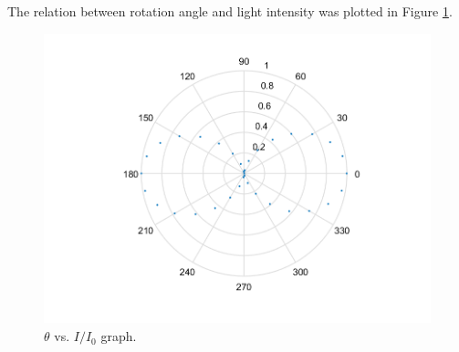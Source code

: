 The relation between rotation angle and light intensity was plotted in Figure \ref{fig-deg-0}.
\begin{figure}[H]
\centering
\includegraphics[scale=0.5]{deg-0.png}
\caption{$\theta$ vs. $I/I_0$ graph.}
\label{fig-deg-0}
\end{figure}
